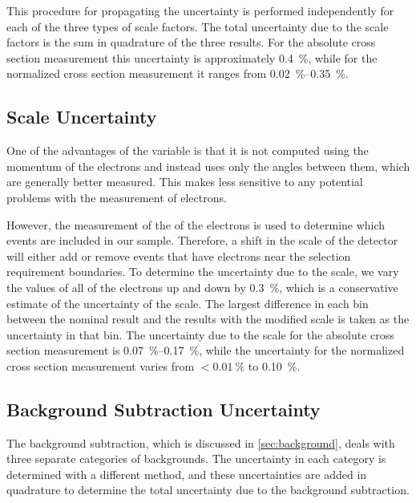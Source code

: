 This procedure for propagating the uncertainty is performed independently for
each of the three types of scale factors. The total uncertainty due to the
scale factors is the sum in quadrature of the three results. For the absolute
cross section measurement this uncertainty is approximately \SI{0.4}{\percent},
while for the normalized cross section measurement it ranges from
\SIrange{0.02}{0.35}{\percent}.

\subsection{\texorpdfstring{\pt}{PT} Scale Uncertainty}
\label{ssec:pt_scale_uncertainty}

One of the advantages of the \phistar variable is that it is not computed using
the momentum of the electrons and instead uses only the angles between them,
which are generally better measured. This makes \phistar less sensitive to any
potential problems with the \pt measurement of electrons.

However, the measurement of the \pt of the electrons is used to determine which
events are included in our sample. Therefore, a shift in the \pt scale of the
detector will either add or remove events that have electrons near the \pt
selection requirement boundaries. To determine the uncertainty due to the \pt
scale, we vary the \pt values of all of the electrons up and down by
\SI{0.3}{\percent}, which is a conservative estimate of the uncertainty of the
\pt scale. The largest difference in each \phistar bin between the nominal
result and the results with the modified \pt scale is taken as the uncertainty
in that bin. The uncertainty due to the \pt scale for the absolute cross
section measurement is \SIrange{0.07}{0.17}{\percent}, while the uncertainty
for the normalized cross section measurement varies from $<
\SI{0.01}{\percent}$ to \SI{0.10}{\percent}.

\subsection{Background Subtraction Uncertainty}
\label{ssec:background_subtraction_uncertainty}

The background subtraction, which is discussed in \cref{sec:background},
deals with three separate categories of backgrounds. The uncertainty in
each category is determined with a different method, and these uncertainties
are added in quadrature to determine the total uncertainty due to the
background subtraction.

